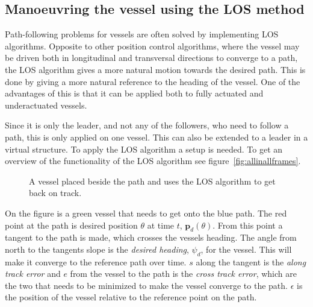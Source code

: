 \subsection{Manoeuvring the vessel using the LOS method}
Path-following problems for vessels are often solved by implementing \ac{LOS} algorithms. Opposite to other position control algorithms, where the vessel may be driven both in longitudinal and transversal directions to converge to a path, the \ac{LOS} algorithm gives a more natural motion towards the desired path. This is done by giving a more natural reference to the heading of the vessel. One of the advantages of this is that it can be applied both to fully actuated and underactuated vessels.

Since it is only the leader, and not any of the followers, who need to follow a path, this is only applied on one vessel. This can also be extended to a leader in a virtual structure. To apply the \ac{LOS} algorithm a setup is needed. To get an overview of the functionality of the \ac{LOS} algorithm see figure~\vref{fig:allinallframes}.
\begin{figure}[htbp]
	\centering
	
	\caption{A vessel placed beside the path and uses the \ac{LOS} algorithm to get back on track.}
	\label{fig:allinallframes}
\end{figure}
On the figure is a green vessel that needs to get onto the blue path. The red point at the path is desired position $\theta$ at time $t$, $\textbf{p}_d(\theta)$. From this point a tangent to the path is made, which crosses the vessels heading. The angle from north to the tangents slope is the \textit{desired heading}, $\psi_d$, for the vessel. This will make it converge to the reference path over time. $s$ along the tangent is the \textit{along track error} and $e$ from the vessel to the path is the \textit{cross track error}, which are  the two that needs to be minimized to make the vessel converge to the path. $\epsilon$ is the position of the vessel relative to the reference point on the path.

